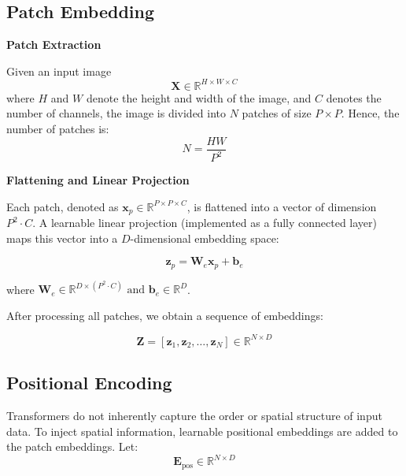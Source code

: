\subsection{Patch Embedding}

\textbf{Patch Extraction}

Given an input image
\begin{equation}
  \mathbf{X} \in \mathbb{R}^{H \times W \times C}
\end{equation}
where \(H\) and \(W\) denote the height and width of the image, and \(C\) denotes the number of channels, the image is divided into \(N\) patches of size \(P \times P\). Hence, the number of patches is:
\begin{equation}
  N = \frac{HW}{P^2}
\end{equation}

\textbf{Flattening and Linear Projection}

Each patch, denoted as \(\mathbf{x}_p \in \mathbb{R}^{P \times P \times C}\), is flattened into a vector of dimension \(P^2 \cdot C\). A learnable linear projection (implemented as a fully connected layer) maps this vector into a \(D\)-dimensional embedding space:

\begin{equation}
  \mathbf{z}_p = \mathbf{W}_e \mathbf{x}_p + \mathbf{b}_e
\end{equation}

where $\mathbf{W}_e \in \mathbb{R}^{D \times (P^2 \cdot C)} \text{ and } \mathbf{b}_e \in \mathbb{R}^{D}$.

After processing all patches, we obtain a sequence of embeddings:

\begin{equation}
  \mathbf{Z} = \left[\mathbf{z}_1, \mathbf{z}_2, \dots, \mathbf{z}_N\right] \in \mathbb{R}^{N \times D}
\end{equation}

\subsection{Positional Encoding}

Transformers do not inherently capture the order or spatial structure of input data. To inject spatial information, learnable positional embeddings are added to the patch embeddings. Let:
\begin{equation}
  \mathbf{E}_{\text{pos}} \in \mathbb{R}^{N \times D}
\end{equation}


